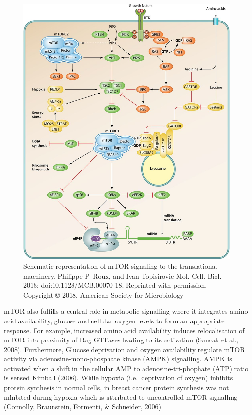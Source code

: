 \documentclass[
  12pt,
  openany]{book}
\begin{document}
\begin{figure}
  \includegraphics{./figures/mTORsignal.jpg}
  \caption{Schematic representation of mTOR signaling to the translational machinery. Philippe P. Roux, and Ivan Topisirovic Mol. Cell. Biol. 2018; doi:10.1128/MCB.00070-18. Reprinted with permission. Copyright © 2018, American Society for Microbiology
 \label{fig:mtorsignal}}
\end{figure}

mTOR also fulfills a central role in metabolic signalling where it integrates amino acid availability, glucose and cellular oxygen levels to form an appropriate response. For example, increased amino acid availability induces relocalisation of mTOR into proximity of Rag GTPases leading to its activation (Sancak et al., 2008). Furthermore, Glucose deprivation and oxygen availability regulate mTOR activity via adenosine-mono-phosphate kinase (AMPK) signalling. AMPK is activated when a shift in the cellular AMP to adenosine-tri-phophate (ATP) ratio is sensed Kimball (2006). While hypoxia (i.e.~deprivation of oxygen) inhibits protein synthesis in normal cells, in breast cancer protein synthesis was not inhibited during hypoxia which is attributed to uncontrolled mTOR signalling (Connolly, Braunstein, Formenti, \& Schneider, 2006).
\end{document}
